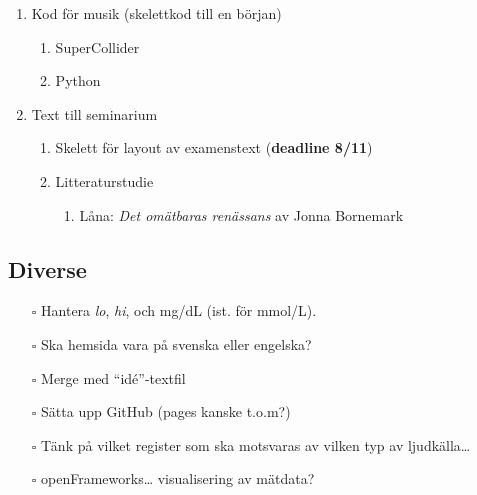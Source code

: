 \begin{enumerate}
\def\labelenumi{\arabic{enumi}.}
\tightlist
\item
  Kod för musik (skelettkod till en början)

  \begin{enumerate}
  \def\labelenumii{\arabic{enumii}.}
  \tightlist
  \item
    SuperCollider
  \item
    Python
  \end{enumerate}
\item
  Text till seminarium

  \begin{enumerate}
  \def\labelenumii{\arabic{enumii}.}
  \tightlist
  \item
    Skelett för layout av examenstext (\textbf{deadline 8/11})
  \item
    Litteraturstudie

    \begin{enumerate}
    \def\labelenumiii{\arabic{enumiii}.}
    \tightlist
    \item
      Låna: \emph{Det omätbaras renässans} av Jonna Bornemark
    \end{enumerate}
  \end{enumerate}
\end{enumerate}

\hypertarget{diverse}{%
\subsection{Diverse}\label{diverse}}

\begin{itemize}
\tightlist
\item[$\square$]
  Hantera \emph{lo}, \emph{hi}, och mg/dL (ist. för mmol/L).
\item[$\square$]
  Ska hemsida vara på svenska eller engelska?
\item[$\square$]
  Merge med ``idé''-textfil
\item[$\square$]
  Sätta upp GitHub (pages kanske t.o.m?)
\item[$\square$]
  Tänk på vilket register som ska motsvaras av vilken typ av
  ljudkälla\ldots{}
\item[$\square$]
  openFrameworks\ldots{} visualisering av mätdata?
\end{itemize}
